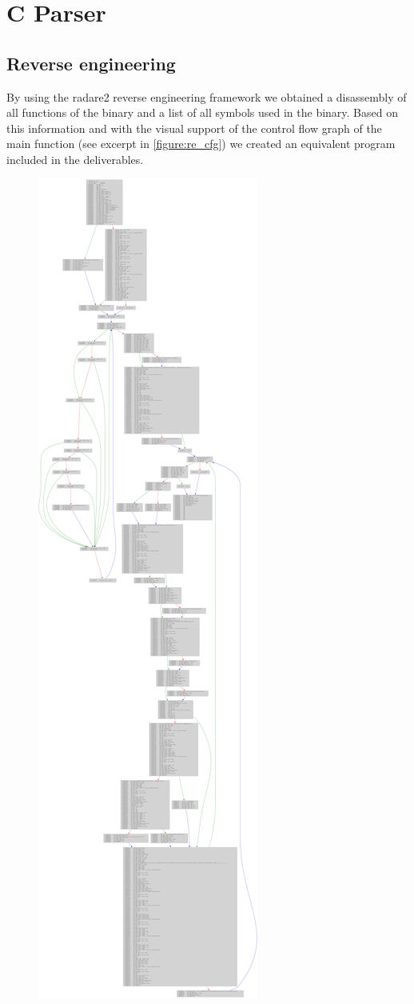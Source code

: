 \newpage
\section{C Parser}
\subsection{Reverse engineering} \label{chapter:re_rad}
By using the radare2 reverse engineering framework we obtained a disassembly of
all functions of the binary and a list of all symbols used in the binary.
Based on this information and with the visual support of the control flow graph
of the main function (see excerpt in \autoref{figure:re_cfg}) we created an
equivalent program included in the deliverables.

\begin{figure}[h!tbp]
	\centering
	\includegraphics[trim={5cm 218cm 25cm 0},clip,height=\textheight]{figures/re_cfg}

\end{figure}
